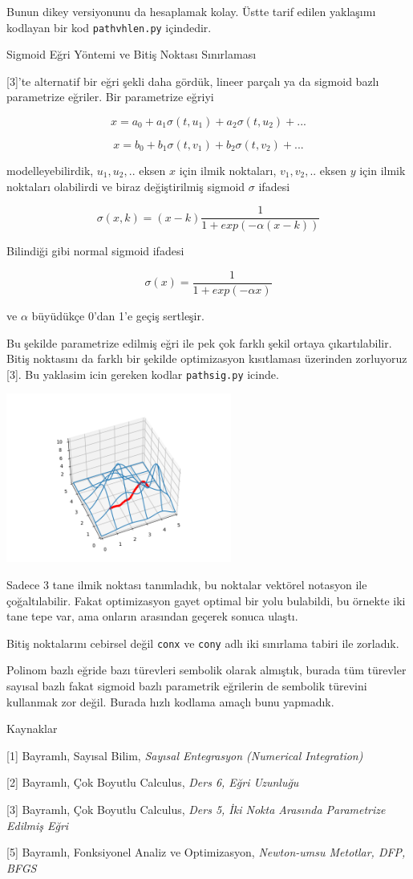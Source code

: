 \documentclass[12pt,fleqn]{article}\usepackage{../../common}
\begin{document}
Bunun dikey versiyonunu da hesaplamak kolay. Üstte tarif edilen yaklaşımı
kodlayan bir kod \verb!pathvhlen.py! içindedir. 

Sigmoid Eğri Yöntemi ve Bitiş Noktası Sınırlaması

[3]'te alternatif bir eğri şekli daha gördük, lineer parçalı ya da sigmoid
bazlı parametrize eğriler. Bir parametrize eğriyi 

$$
x = a_0 + a_1 \sigma(t,u_1) + a_2 \sigma(t,u_2) + ... 
$$

$$
x = b_0 + b_1 \sigma(t,v_1) + b_2 \sigma(t,v_2) + ... 
$$

modelleyebilirdik, $u_1,u_2,..$ eksen $x$ için ilmik noktaları,
$v_1,v_2,..$ eksen $y$ için ilmik noktaları olabilirdi ve biraz
değiştirilmiş sigmoid $\sigma$ ifadesi

$$
\sigma (x,k) = (x-k) \frac{1}{1 + exp(-\alpha (x-k))}
$$

Bilindiği gibi normal sigmoid ifadesi

$$
\sigma (x) = \frac{1}{1 + exp(-\alpha x)}
$$

ve $\alpha$ büyüdükçe 0'dan 1'e geçiş sertleşir. 

Bu şekilde parametrize edilmiş eğri ile pek çok farklı şekil ortaya
çıkartılabilir. Bitiş noktasını da farklı bir şekilde optimizasyon kısıtlaması
üzerinden zorluyoruz [3]. Bu yaklasim icin gereken kodlar \verb!pathsig.py!
icinde.

\includegraphics[width=20em]{calc_multi_40_elev_06.png}

Sadece 3 tane ilmik noktası tanımladık, bu noktalar vektörel notasyon ile
çoğaltılabilir. Fakat optimizasyon gayet optimal bir yolu bulabildi, bu
örnekte iki tane tepe var, ama onların arasından geçerek sonuca ulaştı. 

Bitiş noktalarını cebirsel değil \verb!conx! ve \verb!cony! adlı iki
sınırlama tabiri ile zorladık.

Polinom bazlı eğride bazı türevleri sembolik olarak almıştık, burada
tüm türevler sayısal bazlı fakat sigmoid bazlı parametrik eğrilerin de
sembolik türevini kullanmak zor değil. Burada hızlı kodlama amaçlı bunu
yapmadık. 

Kaynaklar 

[1] Bayramlı, Sayısal Bilim, {\em Sayısal Entegrasyon (Numerical Integration)}

[2] Bayramlı, Çok Boyutlu Calculus, {\em Ders 6, Eğri Uzunluğu}

[3] Bayramlı, Çok Boyutlu Calculus, {\em Ders 5, İki Nokta Arasında Parametrize Edilmiş Eğri}

[5] Bayramlı, Fonksiyonel Analiz ve Optimizasyon, {\em Newton-umsu Metotlar, DFP, BFGS }
\end{document}
